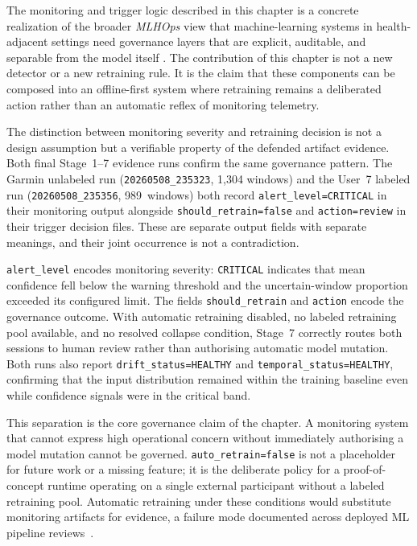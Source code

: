 The monitoring and trigger logic described in this chapter is a concrete realization of the broader \emph{MLHOps} view that machine-learning systems in health-adjacent settings need governance layers that are explicit, auditable, and separable from the model itself \cite{khattak2023mlhops}. The contribution of this chapter is not a new detector or a new retraining rule. It is the claim that these components can be composed into an offline-first system where retraining remains a deliberated action rather than an automatic reflex of monitoring telemetry.

The distinction between monitoring severity and retraining decision is not a design assumption but a verifiable property of the defended artifact evidence. Both final Stage~1--7 evidence runs confirm the same governance pattern. The Garmin unlabeled run (\texttt{20260508\_235323}, 1{,}304 windows) and the User~7 labeled run (\texttt{20260508\_235356}, 989~windows) both record \texttt{alert\_level=CRITICAL} in their monitoring output alongside \texttt{should\_retrain=false} and \texttt{action=review} in their trigger decision files. These are separate output fields with separate meanings, and their joint occurrence is not a contradiction.

\texttt{alert\_level} encodes monitoring severity: \texttt{CRITICAL} indicates that mean confidence fell below the warning threshold and the uncertain-window proportion exceeded its configured limit. The fields \texttt{should\_retrain} and \texttt{action} encode the governance outcome. With automatic retraining disabled, no labeled retraining pool available, and no resolved collapse condition, Stage~7 correctly routes both sessions to human review rather than authorising automatic model mutation. Both runs also report \texttt{drift\_status=HEALTHY} and \texttt{temporal\_status=HEALTHY}, confirming that the input distribution remained within the training baseline even while confidence signals were in the critical band.

This separation is the core governance claim of the chapter. A monitoring system that cannot express high operational concern without immediately authorising a model mutation cannot be governed. \texttt{auto\_retrain=false} is not a placeholder for future work or a missing feature; it is the deliberate policy for a proof-of-concept runtime operating on a single external participant without a labeled retraining pool. Automatic retraining under these conditions would substitute monitoring artifacts for evidence, a failure mode documented across deployed ML pipeline reviews~\cite{paleyes2022challenges,khattak2023mlhops}.

